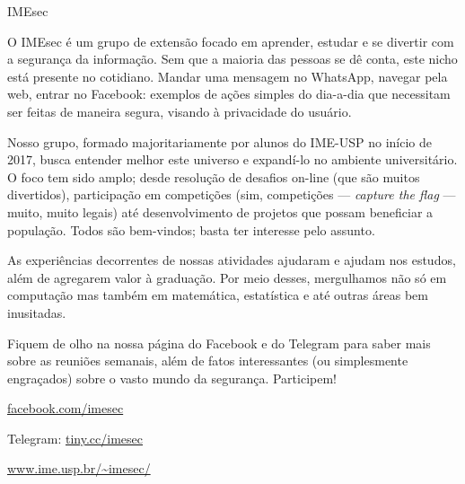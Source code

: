 \begin{subsecao}{IMEsec}


O IMEsec é um grupo de extensão focado em aprender, estudar e se divertir com a
segurança da informação. Sem que a maioria das pessoas se dê conta, este nicho
está presente no cotidiano. Mandar uma mensagem no WhatsApp, navegar pela web,
entrar no Facebook: exemplos de ações simples do dia-a-dia que necessitam ser
feitas de maneira segura, visando à privacidade do usuário.

Nosso grupo, formado majoritariamente por alunos do IME-USP no início de 2017,
busca entender melhor este universo e expandí-lo no ambiente universitário. O
foco tem sido amplo; desde resolução de desafios on-line (que são muitos
divertidos), participação em competições (sim, competições — \textit{capture the
flag} — muito, muito legais) até desenvolvimento de projetos que possam
beneficiar a população. Todos são bem-vindos; basta ter interesse pelo assunto.

As experiências decorrentes de nossas atividades ajudaram e ajudam nos estudos,
além de agregarem valor à graduação. Por meio desses, mergulhamos não só em
computação mas também em matemática, estatística e até outras áreas bem
inusitadas.

Fiquem de olho na nossa página do Facebook e do Telegram para saber mais sobre
as reuniões semanais, além de fatos interessantes (ou simplesmente engraçados)
sobre o vasto mundo da segurança. Participem!

\begin{center}
  \Large
  \url{facebook.com/imesec}

  Telegram: \url{tiny.cc/imesec}

  \url{www.ime.usp.br/~imesec/}
\end{center}

\end{subsecao}
